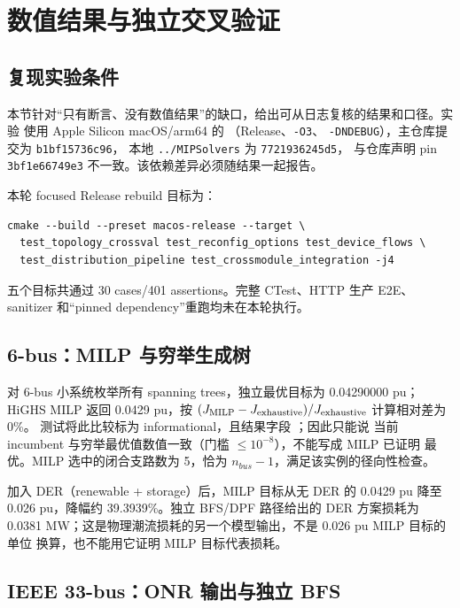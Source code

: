 \section{数值结果与独立交叉验证}\label{sec:nr-numerical-crossval}

\subsection{复现实验条件}

本节针对“只有断言、没有数值结果”的缺口，给出可从日志复核的结果和口径。实验
使用 Apple Silicon macOS/arm64 的 （Release、\texttt{-O3}、
\texttt{-DNDEBUG}），主仓库提交为 \texttt{b1bf15736c96}，
本地 \texttt{../MIPSolvers} 为 \texttt{7721936245d5}，
与仓库声明 pin \texttt{3bf1e66749e3} 不一致。该依赖差异必须随结果一起报告。

本轮 focused Release rebuild 目标为：
\begin{verbatim}
cmake --build --preset macos-release --target \
  test_topology_crossval test_reconfig_options test_device_flows \
  test_distribution_pipeline test_crossmodule_integration -j4
\end{verbatim}
五个目标共通过 30 cases/401 assertions。完整 CTest、HTTP 生产 E2E、sanitizer
和“pinned dependency”重跑均未在本轮执行。

\subsection{6-bus：MILP 与穷举生成树}

对 6-bus 小系统枚举所有 spanning trees，独立最优目标为
0.04290000 pu；HiGHS MILP 返回 0.0429 pu，按
\((J_{\rm MILP}-J_{\rm exhaustive})/J_{\rm exhaustive}\) 计算相对差为 0\%。
测试将此比较标为 informational，且结果字段 ；因此只能说
当前 incumbent 与穷举最优值数值一致（门槛 $\le10^{-8}$），不能写成 MILP 已证明
最优。MILP 选中的闭合支路数为 5，恰为 \(n_{bus}-1\)，满足该实例的径向性检查。

加入 DER（renewable + storage）后，MILP 目标从无 DER 的 0.0429 pu 降至
0.026 pu，降幅约 39.3939\%。独立 BFS/DPF 路径给出的 DER 方案损耗为
0.0381 MW；这是物理潮流损耗的另一个模型输出，不是 0.026 pu MILP 目标的单位
换算，也不能用它证明 MILP 目标代表损耗。

\subsection{IEEE 33-bus：ONR 输出与独立 BFS}

